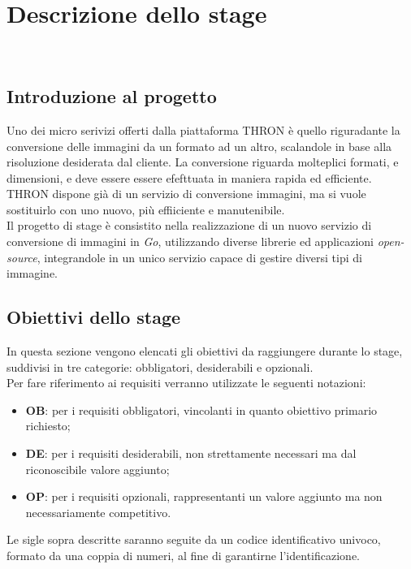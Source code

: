 \chapter{Descrizione dello stage}
\label{cap:descrizione-stage}

\\

\section{Introduzione al progetto}
Uno dei micro serivizi offerti dalla piattaforma THRON è quello riguradante la
conversione delle immagini da un formato ad un altro, scalandole in base alla
risoluzione desiderata dal cliente. La conversione riguarda molteplici formati,
e dimensioni, e deve essere essere efefttuata in maniera rapida ed efficiente.
THRON dispone già di un servizio di conversione immagini, ma si vuole
sostituirlo con uno nuovo, più effiiciente e manutenibile. \\
Il progetto di stage è consistito nella realizzazione di un nuovo servizio di
conversione di immagini in \emph{Go}, utilizzando diverse librerie ed
applicazioni \emph{\glsfirstoccur\gls{open-source}}, integrandole in un unico servizio
capace di gestire diversi tipi di immagine.\\

\section{Obiettivi dello stage}
In questa sezione vengono elencati gli obiettivi da raggiungere durante lo
stage, suddivisi in tre categorie: obbligatori, desiderabili e opzionali.\\
Per fare riferimento ai requisiti verranno utilizzate le seguenti notazioni:
\begin{itemize}
    \item \textbf{OB}: per i requisiti obbligatori, vincolanti in quanto obiettivo
          primario richiesto;
    \item \textbf{DE}: per i requisiti desiderabili, non strettamente necessari
          ma dal riconoscibile valore aggiunto;
    \item \textbf{OP}: per i requisiti opzionali, rappresentanti un valore
          aggiunto ma non necessariamente competitivo.
\end{itemize}
Le sigle sopra descritte saranno seguite da un codice identificativo univoco,
formato da una coppia di numeri, al fine di garantirne l'identificazione.\\
